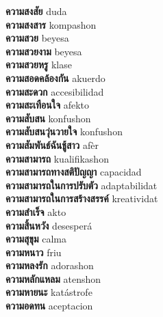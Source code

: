 \textbf{ ความสงสัย  } duda \\
\textbf{ ความสงสาร  } kompashon \\
\textbf{ ความสวย  } beyesa \\
\textbf{ ความสวยงาม  } beyesa \\
\textbf{ ความสวยหรู  } klase \\
\textbf{ ความสอดคล้องกัน  } akuerdo \\
\textbf{ ความสะดวก  } accesibilidad \\
\textbf{ ความสะเทือนใจ  } afekto \\
\textbf{ ความสับสน  } konfushon \\
\textbf{ ความสับสนวุ่นวายใจ  } konfushon \\
\textbf{ ความสัมพันธ์ฉันชู้สาว  } afèr \\
\textbf{ ความสามารถ  } kualifikashon \\
\textbf{ ความสามารถทางสติปัญญา  } capacidad \\
\textbf{ ความสามารถในการปรับตัว  } adaptabilidat \\
\textbf{ ความสามารถในการสร้างสรรค์  } kreatividat \\
\textbf{ ความสำเร็จ  } akto \\
\textbf{ ความสิ้นหวัง  } desesperá \\
\textbf{ ความสุขุม  } calma \\
\textbf{ ความหนาว  } friu \\
\textbf{ ความหลงรัก  } adorashon \\
\textbf{ ความหลักแหลม  } atenshon \\
\textbf{ ความหายนะ  } katástrofe \\
\textbf{ ความอดทน  } aceptacion \\
